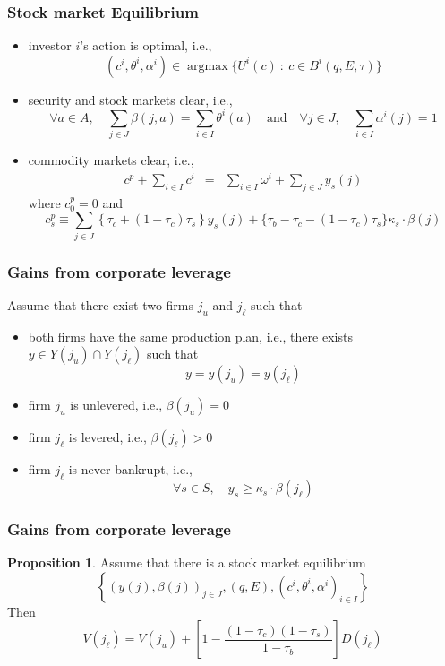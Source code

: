 \documentclass[blue]{beamer}
\def\geq{\geqslant}
\def\et{\quad \textrm{and} \quad}
\DeclareMathOperator\argmax{argmax}
\theoremstyle{definition}
\theoremstyle{example}
\newtheorem*{proposition}{Proposition}
\begin{document}

\begin{frame}\frametitle{Stock market Equilibrium}

\begin{itemize}
\item[(a)] investor $i$'s action is optimal, i.e.,
\[
(c^i,\theta^i,\alpha^i) \in \argmax \{ U^i(c) \ \colon \ c \in B^i(q, E, \tau) \}
\]
\item[(b)] security and stock markets clear, i.e.,
\[
\forall a\in A, \quad \sum_{j\in J} \beta(j,a) = \sum_{i\in I} \theta^i(a) \et \forall j\in J, \quad \sum_{i\in I} \alpha^i(j) =1
\]
\item[(c)] commodity markets clear, i.e.,
\begin{eqnarray*}
c^p + \sum_{i\in I} c^i & = & \sum_{i\in I} \omega^i + \sum_{j\in J} y_s(j)
\end{eqnarray*}
where $c^p_0=0$ and
\[
c^p_s \equiv \sum_{j\in J} \left\{\tau_c + (1-\tau_c)\tau_s\right\} y_s(j) + \{\tau_b - \tau_c -(1-\tau_c)\tau_s\} \kappa_s \cdot \beta(j)
\]
\end{itemize}

\end{frame}


\begin{frame}\frametitle{Gains from corporate leverage}

Assume that there exist two firms $j_u$ and $j_\ell$ such that
\begin{itemize}
\item both firms have the same production plan, i.e., there exists $y\in Y(j_u) \cap Y(j_\ell)$ such that
\[
y= y(j_u) = y(j_\ell)
\]
\item firm $j_u$ is unlevered, i.e., $\beta(j_u) = 0$
\item firm $j_\ell$ is levered, i.e., $\beta(j_\ell)>0$
\item firm $j_\ell$ is never bankrupt, i.e.,
\[
\forall s\in S, \quad y_s \geq \kappa_s \cdot \beta(j_\ell)
\]
\end{itemize}


\end{frame}


\begin{frame}\frametitle{Gains from corporate leverage}

\begin{proposition}
Assume that there is a stock market equilibrium
\[
\left\{ (y(j),\beta(j))_{j\in J}, (q,E), (c^i,\theta^i,\alpha^i)_{i\in I}\right\}
\]
Then
\[
V(j_\ell) = V(j_u) + \left[ 1 - \frac{(1-\tau_c)(1-\tau_s)}{1-\tau_b}\right] D(j_\ell)
\]
\end{proposition}

\end{frame}
\end{document}
